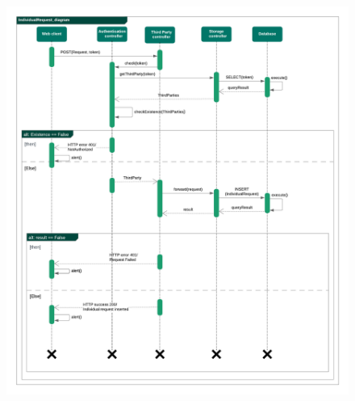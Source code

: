 \begin{legal}
\begin{legal}
				\begin{figure}[H]
				\includegraphics[width=\linewidth]{images/seq_diagrams/individualRequestSeq.png}\\
				\end{figure}
				

\end{legal}
\end{legal}
